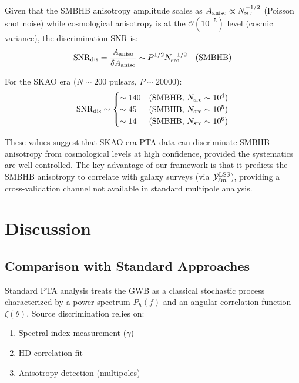 \documentclass[11pt,a4paper]{article}
\begin{document}
Given that the SMBHB anisotropy amplitude scales as $A_{\rm aniso} \propto N_{\rm src}^{-1/2}$ (Poisson shot noise) while cosmological anisotropy is at the $\mathcal{O}(10^{-5})$ level (cosmic variance), the discrimination SNR is:
\begin{equation}
\text{SNR}_{\rm dis} = \frac{A_{\rm aniso}}{\delta A_{\rm aniso}} \sim P^{1/2} N_{\rm src}^{-1/2} \quad \text{(SMBHB)}
\end{equation}

For the SKAO era ($N \sim 200$ pulsars, $P \sim 20000$):
\begin{equation}
\text{SNR}_{\rm dis} \sim \begin{cases}
\sim 140 & \text{(SMBHB, $N_{\rm src} \sim 10^4$)}\\
\sim 45 & \text{(SMBHB, $N_{\rm src} \sim 10^5$)}\\
\sim 14 & \text{(SMBHB, $N_{\rm src} \sim 10^6$)}
\end{cases}
\end{equation}

These values suggest that SKAO-era PTA data can discriminate SMBHB anisotropy from cosmological levels at high confidence, provided the systematics are well-controlled. The key advantage of our framework is that it predicts the SMBHB anisotropy to correlate with galaxy surveys (via $\mathcal{Y}_{\ell m}^{\rm LSS}$), providing a cross-validation channel not available in standard multipole analysis.

\section{Discussion}\label{sec:discussion}

\subsection{Comparison with Standard Approaches}\label{sec:comparison}

Standard PTA analysis treats the GWB as a classical stochastic process characterized by a power spectrum $P_h(f)$ and an angular correlation function $\zeta(\theta)$. Source discrimination relies on:
\begin{enumerate}
\item Spectral index measurement ($\gamma$) \cite{Tsang:2024}
\item HD correlation fit \cite{Hellings:1983,Anholm:2009}
\item Anisotropy detection (multipoles) \cite{Siemens:2016,Ellis:2024}
\end{enumerate}
\end{document}
